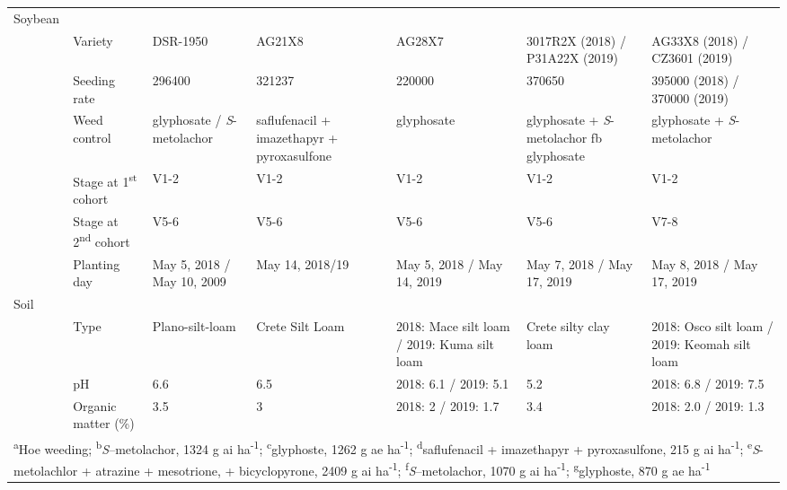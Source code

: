 \begin{table}[!h]
{\begin{tabular}[t]{lllllll}
Soybean &  &  &  &  &  & \\

 & Variety & DSR-1950 & AG21X8 & AG28X7 & 3017R2X (2018) / P31A22X (2019) & AG33X8 (2018) / CZ3601 (2019) \\

 & Seeding rate & 296400 & 321237 & 220000 & 370650 & 395000 (2018) / 370000 (2019) \\

 & Weed control & glyphosate / \emph{S}-metolachor & saflufenacil + imazethapyr + pyroxasulfone & glyphosate & glyphosate + \emph{S}-metolachor fb glyphosate & glyphosate + \emph{S}-metolachor \\

 & Stage at 1\textsuperscript{st} cohort & V1-2 & V1-2 & V1-2 & V1-2 & V1-2 \\

 & Stage at 2\textsuperscript{nd} cohort & V5-6 & V5-6 & V5-6 & V5-6 & V7-8\\

\multirow{-6}{*}{\raggedright\arraybackslash } & Planting day & May 5, 2018 / May 10, 2009 & May 14, 2018/19 & May 5, 2018 / May 14, 2019 & May 7, 2018 / May 17, 2019 & May 8, 2018 / May 17, 2019 \\

Soil &  &  &  &  &  & \\

 & Type & Plano-silt-loam & Crete Silt Loam & 2018: Mace silt loam / 2019: Kuma silt loam & Crete silty clay loam &  2018: Osco silt loam / 2019: Keomah silt loam \\

 & pH & 6.6 & 6.5 & 2018: 6.1 / 2019: 5.1 & 5.2 &  2018: 6.8 / 2019: 7.5\\

\multirow{-4}{*}{\raggedright\arraybackslash } & Organic matter (\%) & 3.5 & 3 & 2018: 2 / 2019: 1.7 & 3.4 &  2018: 2.0 / 2019: 1.3\\
\bottomrule
\multicolumn{7}{l}{\rule{0pt}{1em}\textsuperscript{a}Hoe weeding; \textsuperscript{b}\emph{S}--metolachor, 1324 g ai ha\textsuperscript{-1}; \textsuperscript{c}glyphoste, 1262 g ae ha\textsuperscript{-1}; \textsuperscript{d}saflufenacil + imazethapyr + pyroxasulfone, 215 g ai ha\textsuperscript{-1}; \textsuperscript{e}\emph{S}-metolachlor + atrazine + mesotrione, + bicyclopyrone, 2409 g ai ha\textsuperscript{-1}; \textsuperscript{f}\emph{S}--metolachor, 1070 g ai ha\textsuperscript{-1}; \textsuperscript{g}glyphoste, 870 g ae ha\textsuperscript{-1}} \\
\end{tabular}}
\end{table}




